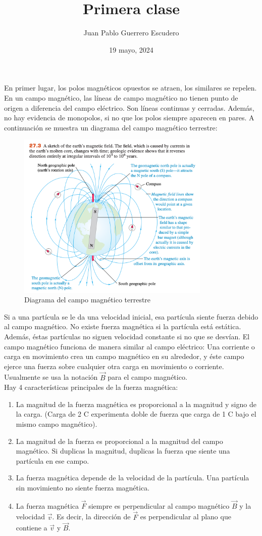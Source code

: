 \documentclass[12pt, letterpaper]{report}
\title{Primera clase}
\author{Juan Pablo Guerrero Escudero}
\date{19 mayo, 2024}
\begin{document}
\maketitle
En primer lugar, los polos magnéticos opuestos se atraen, los similares se repelen. En un campo magnético, 
las líneas de campo magnético no tienen punto de origen a diferencia del campo eléctrico. Son líneas continuas y cerradas. 
Además, no hay evidencia de monopolos, si no que los polos siempre aparecen en pares. A continuación se muestra 
un diagrama del campo magnético terrestre: 
\begin{figure}[H]
    \centering
    \includegraphics[height = 8cm]{Diagrama1_CampoMagneticoTerrestre.png}
    \caption{Diagrama del campo magnético terrestre}
\end{figure}
Si a una partícula se le da una velocidad inicial, esa partícula siente fuerza debido al campo magnético. No existe fuerza 
magnética si la partícula está estática. Además, éstas partículas no siguen velocidad constante si no que 
se desvían. El campo magnético funciona de manera similar al campo eléctrico: Una corriente o carga en movimiento crea un campo magnético en 
su alrededor, y éste campo ejerce una fuerza sobre cualquier otra carga en movimiento o corriente. Usualmente se usa 
la notación $\vec{B}$ para el campo magnético. \\
Hay 4 características principales de la fuerza magnética: 
\begin{enumerate}
\item La magnitud de la fuerza magnética es proporcional a la magnitud y signo de la carga. (Carga de 2 C experimenta doble de fuerza que carga de 1 C bajo 
el mismo campo magnético). 
\item La magnitud de la fuerza es proporcional a la magnitud del campo magnético. Si duplicas la magnitud, duplicas la fuerza 
que siente una partícula en ese campo. 
\item La fuerza magnética depende de la velocidad de la partícula. Una partícula sin movimiento no siente fuerza magnética. 
\item La fuerza magnética $\vec{F}$ siempre es perpendicular al campo magnético $\vec{B}$ y la velocidad $\vec{v}$. Es decir, la dirección de 
$\vec{F}$ es perpendicular al plano que contiene a $\vec{v}$ y $\vec{B}$. 
\end{enumerate}
\end{document}
